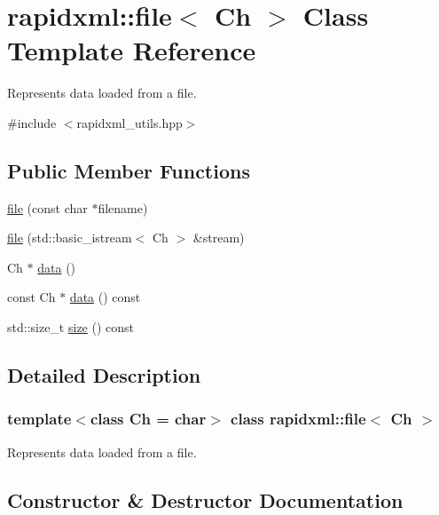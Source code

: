 \hypertarget{classrapidxml_1_1file}{}\section{rapidxml\+:\+:file$<$ Ch $>$ Class Template Reference}
\label{classrapidxml_1_1file}


Represents data loaded from a file.  




{\ttfamily \#include $<$rapidxml\+\_\+utils.\+hpp$>$}

\subsection*{Public Member Functions}
\begin{DoxyCompactItemize}
\item 
\mbox{\hyperlink{classrapidxml_1_1file_ae881a3cab1fe7152d45c92a8d7606cb3}{file}} (const char $\ast$filename)
\item 
\mbox{\hyperlink{classrapidxml_1_1file_a90707ccd991cc392dcf4bef37eed9d1f}{file}} (std\+::basic\+\_\+istream$<$ Ch $>$ \&stream)
\item 
Ch $\ast$ \mbox{\hyperlink{classrapidxml_1_1file_af1c71d65862c7af14e4708e32a80c1de}{data}} ()
\item 
const Ch $\ast$ \mbox{\hyperlink{classrapidxml_1_1file_a044bdd99e59157b8a5a1b28c2f32da4d}{data}} () const
\item 
std\+::size\+\_\+t \mbox{\hyperlink{classrapidxml_1_1file_aacd451b3def3ad056fe8342dccee35cd}{size}} () const
\end{DoxyCompactItemize}


\subsection{Detailed Description}
\subsubsection*{template$<$class Ch = char$>$\newline
class rapidxml\+::file$<$ Ch $>$}

Represents data loaded from a file. 

\subsection{Constructor \& Destructor Documentation}
\mbox{\label{classrapidxml_1_1file_ae881a3cab1fe7152d45c92a8d7606cb3}} 
